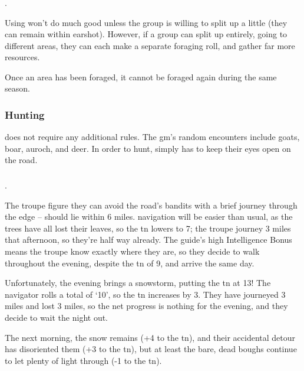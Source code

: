 \begin{multicols}{2}
\subsubsection{}
%
.

Using  won't do much good unless the group is willing to split up a little (they can remain within earshot).
However, if a group can split up entirely, going to different areas, they can each make a separate foraging roll, and gather far more resources.

Once an area has been foraged, it cannot be foraged again during the same season.

\subsubsection{Hunting}
does not require any additional rules.
The \gls{gm}'s random encounters include goats, boar, auroch, and deer.%
In order to hunt,  simply has to keep their eyes open on the road.

\subsubsection{}
\label{navigate_land}
.

\begin{exampletext}
  The troupe figure they can avoid the road's bandits with a brief journey through the \gls{edge} --  should lie within 6 miles.
  \Gls{navigation} will be easier than usual, as the trees have all lost their leaves, so the \gls{tn} lowers to 7; the troupe journey 3 miles that afternoon, so they're half way already.
  The guide's high Intelligence Bonus means the troupe know exactly where they are, so they decide to walk throughout the evening, despite the \gls{tn} of 9, and arrive the same day.

  Unfortunately, the evening brings a snowstorm, putting the \gls{tn} at 13!
  The navigator rolls a total of `10', so the \gls{tn} increases by 3.
  They have journeyed 3 miles and lost 3 miles, so the net progress is nothing for the evening, and they decide to wait the night out.

  The next morning, the snow remains (+4 to the \gls{tn}), and their accidental detour has disoriented them (+3 to the \gls{tn}), but at least the bare, dead boughs continue to let plenty of light through (-1 to the \gls{tn}).


\end{exampletext}
\end{multicols}
